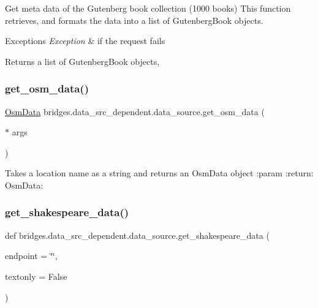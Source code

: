 Get meta data of the Gutenberg book collection (1000 books) This function retrieves, and formats the data into a list of Gutenberg\+Book objects. 


\begin{DoxyExceptions}{Exceptions}
{\em Exception} & if the request fails\\
\hline
\end{DoxyExceptions}
\begin{DoxyReturn}{Returns}
a list of Gutenberg\+Book objects, 
\end{DoxyReturn}
\mbox{\label{namespacebridges_1_1data__src__dependent_1_1data__source_ae33c7ed8751b98e913b4485c0b124ed3}} 
\subsubsection{\texorpdfstring{get\_osm\_data()}{get\_osm\_data()}}
{\footnotesize\ttfamily  \mbox{\hyperlink{classbridges_1_1data__src__dependent_1_1osm_1_1_osm_data}{Osm\+Data}} bridges.\+data\+\_\+src\+\_\+dependent.\+data\+\_\+source.\+get\+\_\+osm\+\_\+data (\begin{DoxyParamCaption}\item[{$\ast$}]{args }\end{DoxyParamCaption})}



Takes a location name as a string and returns an Osm\+Data object \+:param \+:return\+: Osm\+Data\+: 

\mbox{\label{namespacebridges_1_1data__src__dependent_1_1data__source_a141593343ceef42e35072b3151a8b2db}} 
\subsubsection{\texorpdfstring{get\_shakespeare\_data()}{get\_shakespeare\_data()}}
{\footnotesize\ttfamily def bridges.\+data\+\_\+src\+\_\+dependent.\+data\+\_\+source.\+get\+\_\+shakespeare\+\_\+data (\begin{DoxyParamCaption}\item[{}]{endpoint = {\ttfamily \char`\"{}\char`\"{}},  }\item[{}]{textonly = {\ttfamily False} }\end{DoxyParamCaption})}



